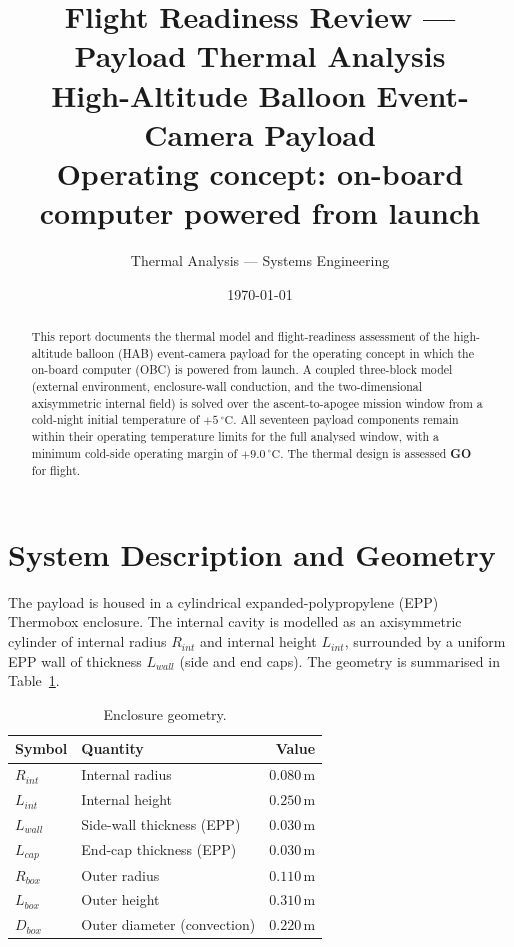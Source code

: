 \documentclass[11pt,a4paper]{article}
\title{\textbf{Flight Readiness Review --- Payload Thermal Analysis}\\[2mm]
\large High-Altitude Balloon Event-Camera Payload\\[1mm]
\normalsize Operating concept: on-board computer powered from launch}
\author{Thermal Analysis --- Systems Engineering}
\date{\today}
\newcommand{\degC}{\,^{\circ}\mathrm{C}}
\newcommand{\unit}[1]{\,\mathrm{#1}}
\begin{document}
\maketitle

\begin{abstract}
\noindent This report documents the thermal model and flight-readiness assessment of
the high-altitude balloon (HAB) event-camera payload for the operating concept in which
the on-board computer (OBC) is powered from launch. A coupled three-block model
(external environment, enclosure-wall conduction, and the two-dimensional axisymmetric
internal field) is solved over the ascent-to-apogee mission window from a cold-night
initial temperature of $+5\degC$. All seventeen payload components remain within their
operating temperature limits for the full analysed window, with a minimum cold-side
operating margin of $+9.0\degC$. The thermal design is assessed \textbf{GO} for flight.
\end{abstract}

\tableofcontents
\bigskip

\section{System Description and Geometry}
The payload is housed in a cylindrical expanded-polypropylene (EPP) Thermobox enclosure.
The internal cavity is modelled as an axisymmetric cylinder of internal radius $R_{int}$
and internal height $L_{int}$, surrounded by a uniform EPP wall of thickness $L_{wall}$
(side and end caps). The geometry is summarised in Table~\ref{tab:geom}.

\begin{table}[H]
\centering
\caption{Enclosure geometry.}
\label{tab:geom}
\begin{tabular}{llr}
\toprule
Symbol & Quantity & Value \\
\midrule
$R_{int}$ & Internal radius            & $0.080\unit{m}$ \\
$L_{int}$ & Internal height            & $0.250\unit{m}$ \\
$L_{wall}$& Side-wall thickness (EPP)  & $0.030\unit{m}$ \\
$L_{cap}$ & End-cap thickness (EPP)    & $0.030\unit{m}$ \\
$R_{box}$ & Outer radius               & $0.110\unit{m}$ \\
$L_{box}$ & Outer height               & $0.310\unit{m}$ \\
$D_{box}$ & Outer diameter (convection)& $0.220\unit{m}$ \\
\bottomrule
\end{tabular}
\end{table}
\end{document}
